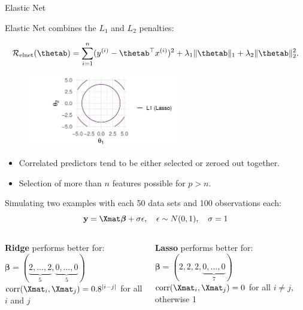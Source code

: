 \begin{vbframe} {Elastic Net}


Elastic Net combines the $L_1$ and $L_2$ penalties:

$$
\mathcal{R}_{\text{elnet}}(\thetab) =  \sumin (\yi - \thetab^\top \xi)^2 + \lambda_1 \|\thetab\|_1 + \lambda_2 \|\thetab\|_2^2.
$$

\begin{figure}
\includegraphics[width=0.6\textwidth]{figure_man/elastic-net01.png}\\
\end{figure}


\begin{itemize}
\item Correlated predictors tend to be either selected or zeroed out together.
\item Selection of more than $n$ features possible for $p>n$.
\end{itemize}


\framebreak
\footnotesize
Simulating two examples with each 50 data sets and 100 observations each: \\


$$\ydat =\Xmat \boldsymbol{\beta}+\sigma \epsilon, \quad \epsilon \sim N(0,1), \quad \sigma = 1$$
  
  \begin{columns}
\begin{column}{0.5\textwidth}
\begin{center}
\textbf{Ridge} performs better for: \\ 
$\boldsymbol{\beta}=(\underbrace{2,\ldots,2}_{5},\underbrace{0,\ldots,0}_{5})$\\
$ \operatorname{corr}(\Xmat_{i},\Xmat_{j})=0.8^{|i-j|}$ for all $i$ and $j$
  \end{center}
\end{column}
\begin{column}{0.5\textwidth} 
\begin{center}
\textbf{Lasso} performs better for: \\
$\boldsymbol{\beta}=(2, 2, 2,\underbrace{0,\ldots,0}_{7})$ \\
$\operatorname{corr}(\Xmat_{i},\Xmat_{j})= 0$ for all $i \neq j$, otherwise 1
\end{center}
\end{column}
\end{columns}


\end{vbframe}
